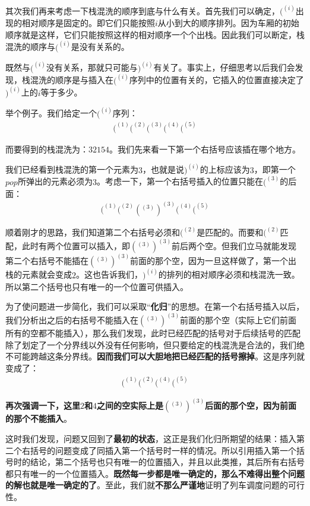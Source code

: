 \documentclass[UTF8]{ctexart}
\begin{document}
	\indent 其次我们再来考虑一下栈混洗的顺序到底与什么有关。首先我们可以确定，$(^{(i)}$出现的相对顺序是固定的。即它们只能按照$i$从小到大的顺序排列。因为车厢的初始顺序就是这样，它们只能按照这样的相对顺序一个个出栈。因此我们可以断定，栈混洗的顺序与$(^{(i)}$是没有关系的。
	
	\indent 既然与$(^{(i)}$没有关系，那就只可能与$)^{(i)}$有关了。事实上，仔细思考以后我们会发现，栈混洗的顺序是与插入在$(^{(i)}$序列中的位置有关的，它插入的位置直接决定了$)^{(i)}$上的$i$等于多少。
	
 	\indent 举个例子。我们给定一个$(^{(i)}$序列：
 	\begin{align}
 	(^{(1)}(^{(2)}(^{(3)}(^{(4)}(^{(5)}
 	\end{align}

	\indent 而要得到的栈混洗为：$32154$。我们先来看一下第一个右括号应该插在哪个地方。
	
	\indent 我们已经看到栈混洗的第一个元素为$3$，也就是说$)^{(i)}$的上标应该为$3$，即第一个$pop$所弹出的元素必须为$3$。考虑一下，第一个右括号插入的位置只能在$(^{(3)}$的后面：
	\begin{align}
 	(^{(1)}(^{(2)}(^{(3)})^{(3)}(^{(4)}(^{(5)}
 	\end{align}

	\indent 顺着刚才的思路，我们知道第二个右括号必须和$(^{(2)}$是匹配的。而要和$(^{(2)}$匹配，此时有两个位置可以插入，即$(^{(3)})^{(3)}$前后两个空。但我们立马就能发现第二个右括号不能插在$(^{(3)})^{(3)}$前面的那个空，因为一旦这样做了，第一个出栈的元素就会变成$2$。这也告诉我们，$)^{(i)}$的排列的相对顺序必须和栈混洗一致。所以第二个括号也只有唯一的一个位置可供插入。
	
	\indent 为了使问题进一步简化，我们可以采取“\textbf{化归}”的思想。在第一个右括号插入以后，我们分析出之后的右括号不能插入在$(^{(3)})^{(3)}$前面的那个空（实际上它们前面所有的空都不能插入），那么我们发现，此时已经匹配的括号对于后续括号的匹配除了划定了一个分界线以外没有任何影响，\textcolor[rgb]{1,0,0}{但只要给定的栈混洗是合法的，我们绝不可能跨越这条分界线}。\textbf{因而我们可以大胆地把已经匹配的括号擦掉}。这是序列就变成了：
	\begin{align}
 	(^{(1)}(^{(2)}(^{(4)}(^{(5)}
 	\end{align}
 	
 	\indent \textbf{再次强调一下，这里$2$和$4$之间的空实际上是$(^{(3)})^{(3)}$后面的那个空，因为前面的那个不能插入}。
 	
 	\indent 这时我们发现，问题又回到了\textbf{最初的状态}，这正是我们化归所期望的结果：插入第二个右括号的问题变成了同插入第一个括号时一样的情况。所以引用插入第一个括号时的结论，第二个括号也只有唯一的位置插入，并且以此类推，其后所有右括号都只有唯一的一个位置插入。\textbf{既然每一步都是唯一确定的，那么不难得出整个问题的解也就是唯一确定的了}。至此，我们就\textbf{不那么严谨地}证明了列车调度问题的可行性。
 	
\end{document}
